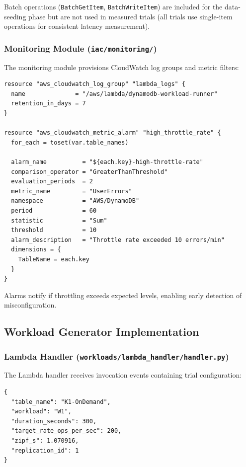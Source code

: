 Batch operations (\texttt{BatchGetItem}, \texttt{BatchWriteItem}) are included for the data-seeding phase but are not used in measured trials (all trials use single-item operations for consistent latency measurement).

\subsubsection{Monitoring Module (\texttt{iac/monitoring/})}

The monitoring module provisions CloudWatch log groups and metric filters:

\begin{verbatim}
resource "aws_cloudwatch_log_group" "lambda_logs" {
  name              = "/aws/lambda/dynamodb-workload-runner"
  retention_in_days = 7
}

resource "aws_cloudwatch_metric_alarm" "high_throttle_rate" {
  for_each = toset(var.table_names)
  
  alarm_name          = "${each.key}-high-throttle-rate"
  comparison_operator = "GreaterThanThreshold"
  evaluation_periods  = 2
  metric_name         = "UserErrors"
  namespace           = "AWS/DynamoDB"
  period              = 60
  statistic           = "Sum"
  threshold           = 10
  alarm_description   = "Throttle rate exceeded 10 errors/min"
  dimensions = {
    TableName = each.key
  }
}
\end{verbatim}

Alarms notify if throttling exceeds expected levels, enabling early detection of misconfiguration.

\subsection{Workload Generator Implementation}

\subsubsection{Lambda Handler (\texttt{workloads/lambda\_handler/handler.py})}

The Lambda handler receives invocation events containing trial configuration:

\begin{verbatim}
{
  "table_name": "K1-OnDemand",
  "workload": "W1",
  "duration_seconds": 300,
  "target_rate_ops_per_sec": 200,
  "zipf_s": 1.070916,
  "replication_id": 1
}
\end{verbatim}

